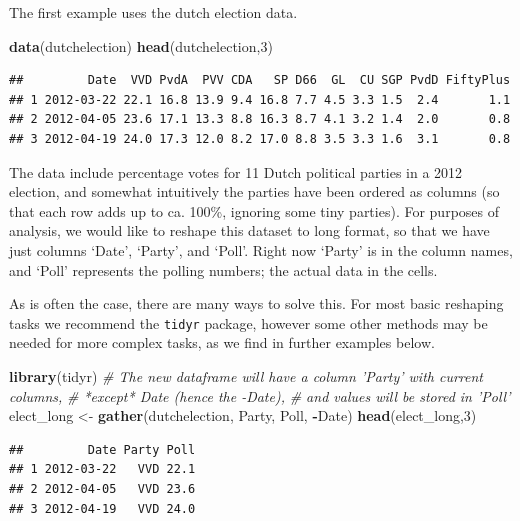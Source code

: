 \documentclass[]{book}
\newenvironment{Shaded}{\begin{snugshade}}{\end{snugshade}}
\newcommand{\CommentTok}[1]{\textcolor[rgb]{0.56,0.35,0.01}{\textit{#1}}}
\newcommand{\DecValTok}[1]{\textcolor[rgb]{0.00,0.00,0.81}{#1}}
\newcommand{\KeywordTok}[1]{\textcolor[rgb]{0.13,0.29,0.53}{\textbf{#1}}}
\newcommand{\NormalTok}[1]{#1}
\newcommand{\OperatorTok}[1]{\textcolor[rgb]{0.81,0.36,0.00}{\textbf{#1}}}
\newcommand{\StringTok}[1]{\textcolor[rgb]{0.31,0.60,0.02}{#1}}
\begin{document}
The first example uses the dutch election data.

\begin{Shaded}
\begin{Highlighting}[]
\KeywordTok{data}\NormalTok{(dutchelection)}
\KeywordTok{head}\NormalTok{(dutchelection,}\DecValTok{3}\NormalTok{)}
\end{Highlighting}
\end{Shaded}

\begin{verbatim}
##         Date  VVD PvdA  PVV CDA   SP D66  GL  CU SGP PvdD FiftyPlus
## 1 2012-03-22 22.1 16.8 13.9 9.4 16.8 7.7 4.5 3.3 1.5  2.4       1.1
## 2 2012-04-05 23.6 17.1 13.3 8.8 16.3 8.7 4.1 3.2 1.4  2.0       0.8
## 3 2012-04-19 24.0 17.3 12.0 8.2 17.0 8.8 3.5 3.3 1.6  3.1       0.8
\end{verbatim}

The data include percentage votes for 11 Dutch political parties in a 2012 election, and somewhat intuitively the parties have been ordered as columns (so that each row adds up to ca. 100\%, ignoring some tiny parties). For purposes of analysis, we would like to reshape this dataset to long format, so that we have just columns `Date', `Party', and `Poll'. Right now `Party' is in the column names, and `Poll' represents the polling numbers; the actual data in the cells.

As is often the case, there are many ways to solve this. For most basic reshaping tasks we recommend the \texttt{tidyr} package, however some other methods may be needed for more complex tasks, as we find in further examples below.

\begin{Shaded}
\begin{Highlighting}[]
\KeywordTok{library}\NormalTok{(tidyr)}
\CommentTok{# The new dataframe will have a column 'Party' with current columns,}
\CommentTok{# *except* Date (hence the -Date),}
\CommentTok{# and values will be stored in 'Poll'}
\NormalTok{elect_long <-}\StringTok{ }\KeywordTok{gather}\NormalTok{(dutchelection, Party, Poll, }\OperatorTok{-}\NormalTok{Date)}
\KeywordTok{head}\NormalTok{(elect_long,}\DecValTok{3}\NormalTok{)}
\end{Highlighting}
\end{Shaded}

\begin{verbatim}
##         Date Party Poll
## 1 2012-03-22   VVD 22.1
## 2 2012-04-05   VVD 23.6
## 3 2012-04-19   VVD 24.0
\end{verbatim}
\end{document}

